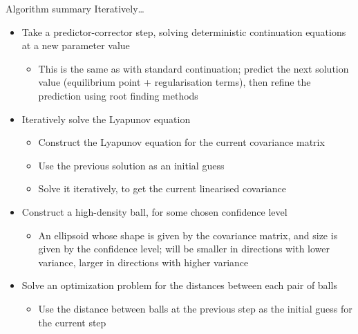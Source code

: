 \documentclass[presentation]{beamer}
\begin{document}
\begin{frame}[label={sec:org3830811},plain]{Algorithm summary}
Iteratively\ldots{}
\begin{itemize}
\item Take a predictor-corrector step, solving deterministic continuation equations at a new parameter value
\begin{itemize}
\item This is the same as with standard continuation; predict the next solution value (equilibrium point + regularisation terms), then refine the prediction using root finding methods
\end{itemize}
\end{itemize}
\vfill
\begin{itemize}
\item Iteratively solve the Lyapunov equation
\begin{itemize}
\item Construct the Lyapunov equation for the current covariance matrix
\item Use the previous solution as an initial guess
\item Solve it iteratively, to get the current linearised covariance
\end{itemize}
\end{itemize}
\vfill
\begin{itemize}
\item Construct a high-density ball, for some chosen confidence level
\begin{itemize}
\item An ellipsoid whose shape is given by the covariance matrix, and size is given by the confidence level; will be smaller in directions with lower variance, larger in directions with higher variance
\end{itemize}
\end{itemize}
\vfill
\begin{itemize}
\item Solve an optimization problem for the distances between each pair of balls
\begin{itemize}
\item Use the distance between balls at the previous step as the initial guess for the current step
\end{itemize}
\end{itemize}
\end{frame}
\end{document}

